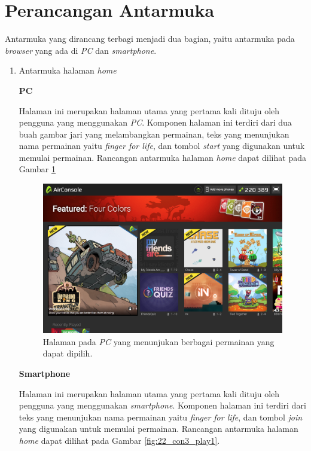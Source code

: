 \section{Perancangan Antarmuka}
\label{sec:antarmuka}

Antarmuka yang dirancang terbagi menjadi dua bagian, yaitu antarmuka pada \textit{browser} yang ada di \textit{PC} dan \textit{smartphone}.

\begin{enumerate}
	\item Antarmuka halaman \textit{home}
	
	\textbf{PC}
	
	Halaman ini merupakan halaman utama yang pertama kali dituju oleh pengguna yang menggunakan \textit{PC}. Komponen halaman ini terdiri dari dua buah gambar jari yang melambangkan permainan, teks yang menunjukan nama permainan yaitu \textit{finger for life}, dan tombol \textit{start} yang digunakan untuk memulai permainan. Rancangan antarmuka halaman \textit{home} dapat dilihat pada Gambar \ref{fig:21_con3_play1}

\begin{figure}[H]
	\centering
	\includegraphics[scale=0.3]{Gambar/con3_play1}
	\caption{Halaman pada \textit{PC} yang menunjukan berbagai permainan yang dapat dipilih.}
	\label{fig:21_con3_play1}
\end{figure}

	\textbf{Smartphone}
	
	Halaman ini merupakan halaman utama yang pertama kali dituju oleh pengguna yang menggunakan \textit{smartphone}. Komponen halaman ini terdiri dari teks yang menunjukan nama permainan yaitu \textit{finger for life}, dan tombol \textit{join} yang digunakan untuk memulai permainan. Rancangan antarmuka halaman \textit{home} dapat dilihat pada Gambar \ref{fig:22_con3_play1}.
	

\end{enumerate}
